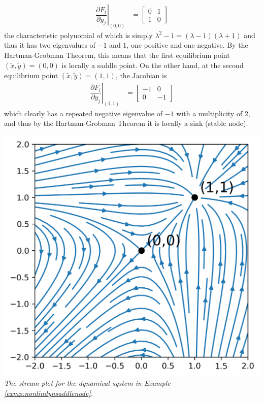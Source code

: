 \begin{solution}
\begin{align*}
\left.\dfrac{\partial F_i}{\partial y_j}\right|_{(0,0)} &= 
\begin{bmatrix}
0 & 1 \\
1 & 0
\end{bmatrix}
\end{align*}
the characteristic polynomial of which is simply $\lambda^2 - 1 = (\lambda - 1)(\lambda + 1)$ and thus it has two eigenvalues of $-1$ and $1$, one positive and one negative. By the Hartman-Grobman Theorem, this means that the first equilibrium point $(\tilde{x}, \tilde{y}) = (0,0)$ is locally a saddle point. On the other hand, at the second equilibrium point $(\tilde{x}, \tilde{y}) = (1,1)$, the Jacobian is
\begin{align*}
\left.\dfrac{\partial F_i}{\partial y_j}\right|_{(1,1)} &= 
\begin{bmatrix}
-1 & 0 \\
0 & -1
\end{bmatrix}
\end{align*}
which clearly has a repeated negative eigenvalue of $-1$ with a multiplicity of $2$, and thus by the Hartman-Grobman Theorem it is locally a sink (stable node).
\end{solution}
\includegraphics[scale=0.7]{graphics/saddlenode.png}\\
\textit{The stream plot for the dynamical system in Example \ref{exmp:nonlindynsaddlenode}.}\par

